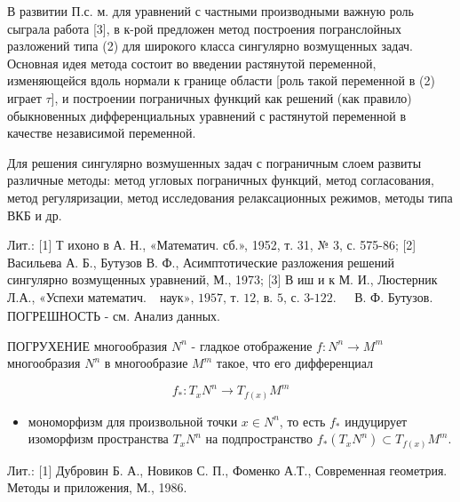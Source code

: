 \documentclass[10pt]{article}
\begin{document}
В развитии П.с. м. для уравнений с частными производными важную роль сыграла работа [3], в к-рой предложен метод построения погранслойных разложений типа (2) для широкого класса сингулярно возмущенных задач. Основная идея метода состоит во введении растянутой переменной, изменяющейся вдоль нормали к границе области [роль такой переменной в (2) играет $\tau]$, и построении пограничных функций как решений (как правило) обыкновенных дифференциальных уравнений с растянутой переменной в качестве независимой переменной.



Для решения сингулярно возмушенных задач с пограничным слоем развиты различные методы: метод угловых пограничных функций, метод согласования, метод регуляризации, метод исследования релаксационных режимов, методы типа ВКБ и др.



Лит.: [1] Т ихоно в А. Н., «Математич. сб.», 1952, т. 31, № 3, с. 575-86; [2] Васильева А. Б., Бутузов В. Ф., Асимптотические разложения решений сингулярно возмущенных уравнений, М., 1973; [3] В иш и к М. И., Люстерник Л.А., «Успехи математич. $\begin{array}{ll}\text { наук», 1957, т. 12, в. 5, с. 3-122. } & \text { В. Ф. Бутузов. }\end{array}$ ПОГРЕШНОСТЬ - см. Анализ данных.



ПОГРУХЕНИЕ многообразия $N^{n}$ - гладкое отображение $f: N^{n} \rightarrow M^{m}$ многообразия $N^{n}$ в многообразие $M^{m}$ такое, что его дифференциал



\[

f_{*}: T_{x} N^{n} \rightarrow T_{f(x)} M^{m}

\]



\begin{itemize}

  \item мономорфизм для произвольной точки $x \in N^{n}$, то есть $f_{*}$ индуцирует изоморфизм пространства $T_{x} N^{n}$ на подпространство $f_{*}\left(T_{x} N^{n}\right) \subset T_{f(x)} M^{m}$.

\end{itemize}



Лит.: [1] Дубровин Б. А., Новиков С. П., Фоменко А.Т., Современная геометрия. Методы и приложения, М., 1986.
\end{document}
